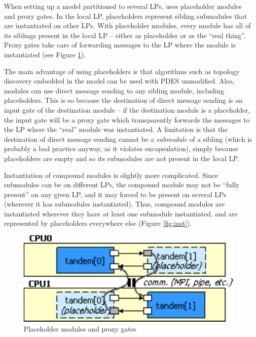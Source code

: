 When setting up a model partitioned to several LPs,
{\opp} uses placeholder modules and proxy gates.
In the local LP, placeholders represent sibling submodules
that are instantiated on other LPs.
With placeholder modules, every module has all of its siblings
present in the local LP -- either as placeholder or as the ``real thing''.
Proxy gates take care of forwarding messages to the LP where
the module is instantiated (see Figure \ref{fig:plach}).

The main advantage of using placeholders is that algorithms such as
topology discovery embedded in the model can be used with PDES unmodified.
Also, modules can use direct message sending to any sibling module,
including placeholders. This is so because the destination of direct message
sending is an input gate of the destination module -- if the destination
module is a placeholder, the input gate will be a proxy gate which
transparently forwards the messages to the LP where the ``real'' module
was instantiated. A limitation is that the destination of direct message
sending cannot be a \textit{submodule} of a sibling (which is
probably a bad practice anyway, as it violates encapsulation),
simply because placeholders are empty and so its submodules are
not present in the local LP.

Instantiation of compound modules is slightly more complicated.
Since submodules can be on different LPs, the compound module may
not be ``fully present'' on any given LP, and it may forced to be
present on several LPs (wherever it has submodules instantiated).
Thus, compound modules are instantiated wherever they have
at least one submodule instantiated, and are represented by placeholders
everywhere else (Figure \ref{fig:inst}).


\begin{figure}[htbp]
  \begin{center}
    \includegraphics{figures/placeholders}
    \caption{Placeholder modules and proxy gates}
    \label{fig:plach}
  \end{center}
\end{figure}

